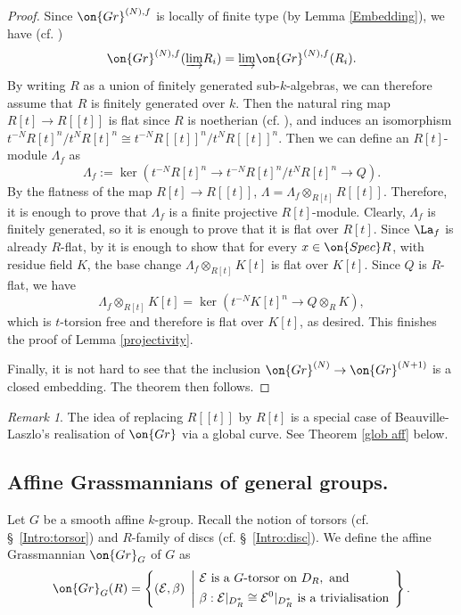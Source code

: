 \documentclass[]{pcmi}
\theoremstyle{plain}
\theoremstyle{remark}
\newtheorem{rmk}[equation]{Remark}
\theoremstyle{definition}
\newcommand{\mE}{{\mathcal E}}
\newcommand{\Gr}{{\on{Gr}}}
\newcommand{\Spec}{\on{Spec}}
\begin{document}
\begin{proof}
Since $\Gr^{(N),f}$ is locally of finite type (by Lemma \ref{Embedding}), we have (cf. \cite[Tag01ZC]{St})
$$\Gr^{(N),f}(\underrightarrow\lim R_i)=\underrightarrow\lim \Gr^{(N),f}(R_i).$$ By writing $R$ as a union of finitely generated sub-$k$-algebras, we can therefore 
assume that $R$ is finitely generated over $k$.
Then the natural ring map $R[t]\to R[[t]]$ is flat since $R$ is noetherian (cf. \cite[Tag00MB]{St}), and induces an isomorphism $t^{-N}R[t]^n/t^NR[t]^n\cong t^{-N}R[[t]]^n/t^NR[[t]]^n$. Then we can define an $R[t]$-module $\Lambda_f$ as
\[\Lambda_f:= \ker( t^{-N}R[t]^n\to  t^{-N}R[t]^n/t^NR[t]^n\to Q).\]
By the flatness of the map $R[t]\to R[[t]]$, $\Lambda=\Lambda_f\otimes_{R[t]}R[[t]]$. Therefore, it is enough to prove that $\Lambda_f$ is a finite projective $R[t]$-module. Clearly, $\Lambda_f$ is finitely generated, so it is enough to prove that it is flat over $R[t]$. Since $\La_f$ is already $R$-flat, by \cite[Tag00MH]{St} it is enough to show that for every $x\in \Spec R$, with residue field $K$, the base change $\Lambda_f\otimes_{R[t]}K[t]$ is flat over $K[t]$. Since $Q$ is $R$-flat, we have
\[\Lambda_f\otimes_{R[t]}K[t]= \ker ( t^{-N}K[t]^n\to Q\otimes_R K),\]
which is  $t$-torsion free and therefore is flat over $K[t]$, as desired. This finishes the proof of Lemma \ref{projectivity}.



Finally, it is not hard to see that the inclusion $\Gr^{(N)}\to \Gr^{(N+1)}$ is a closed embedding. The theorem then follows.
\end{proof}


\begin{rmk}The idea of replacing $R[[t]]$ by $R[t]$ is a special case of Beauville-Laszlo's realisation of $\Gr$ via a global curve. See Theorem \ref{glob aff} below.
\end{rmk}

\subsection{Affine Grassmannians of general groups.}
Let $G$ be a smooth affine $k$-group. Recall the notion of torsors (cf. \S~\ref{Intro:torsor}) and $R$-family of discs (cf. \S~\ref{Intro:disc}).
We define the affine Grassmannian $\Gr_{G}$ of $G$ as
\begin{equation}\label{loc aff}
\Gr_{G}(R)=\left\{(\mE,\beta)\ \left|\ \begin{split}&\mE \mbox{ is a } G\mbox{-torsor on } D_R , \mbox{ and }\\
& \beta:\mE|_{D^*_R}\cong  \mE^0|_{D^*_R}\mbox{ is a trivialisation }\end{split}\right.\right\}.
\end{equation}
\end{document}
